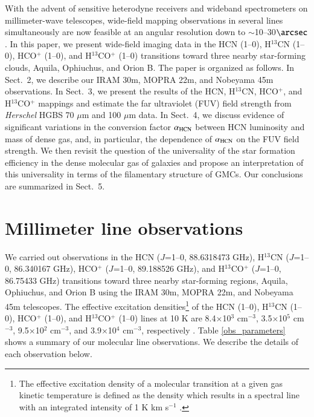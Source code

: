 \documentclass{aa}
\begin{document}
With the advent of sensitive heterodyne receivers and wideband spectrometers on millimeter-wave telescopes, wide-field mapping observations in 
several lines simultaneously are now feasible at an angular resolution down to $\sim$10--30$\arcsec$. 
In this paper, we present wide-field imaging data in the 
HCN (1--0), H$^{13}$CN (1--0), HCO$^{+}$ (1--0), and H$^{13}$CO$^+$ (1--0) transitions toward three nearby star-forming clouds, Aquila, Ophiuchus, and Orion B. 
The paper is organized as follows. In Sect.~2, we describe our IRAM 30m, MOPRA 22m, and Nobeyama 45m observations. In Sect.~3, 
we present the results of the HCN, H$^{13}$CN, HCO$^{+}$, and H$^{13}$CO$^+$ mappings and estimate the far ultraviolet (FUV) field strength 
from {\it Herschel} HGBS 70 $\mu$m and 100 $\mu$m data. In Sect.~4, we discuss evidence of significant variations in the 
conversion factor $\alpha_{\rm HCN}$ between HCN luminosity and mass of dense gas, 
and, in particular, the dependence of $\alpha_{\rm HCN}$ on the FUV field strength. 
We then revisit the question of the universality of the star formation efficiency in the dense molecular gas of galaxies 
and propose an interpretation of this universality in terms of the filamentary structure of GMCs.
Our conclusions are summarized in Sect.~5.

\section{Millimeter line observations}

We carried out observations in the HCN ($J$=1--0, 88.6318473 GHz), H$^{13}$CN ($J$=1--0, 86.340167 GHz), HCO$^+$ ($J$=1--0, 89.188526 GHz), and H$^{13}$CO$^+$ ($J$=1--0, 86.75433 GHz) transitions toward three nearby star-forming regions, Aquila, Ophiuchus, and Orion B using the IRAM 30m, MOPRA 22m, and Nobeyama 45m telescopes. The effective excitation densities\footnote{The effective excitation density of a molecular transition at a given gas kinetic temperature 
is defined as the density which results in a spectral line 
with an integrated intensity of 1 K km s$^{-1}$ \citep{Shirley15}.} of the HCN (1--0), H$^{13}$CN (1--0), HCO$^+$ (1--0), and H$^{13}$CO$^+$ (1--0) lines at 10 K are 8.4$\times$10$^3$ cm$^{-3}$, 3.5$\times$10$^5$ cm$^{-3}$, 9.5$\times$10$^2$ cm$^{-3}$, and 3.9$\times$10$^4$ cm$^{-3}$, respectively \citep{Shirley15}. Table \ref{obs_parameters} shows a summary of our molecular line observations. We describe the details of each observation below.
\end{document}
